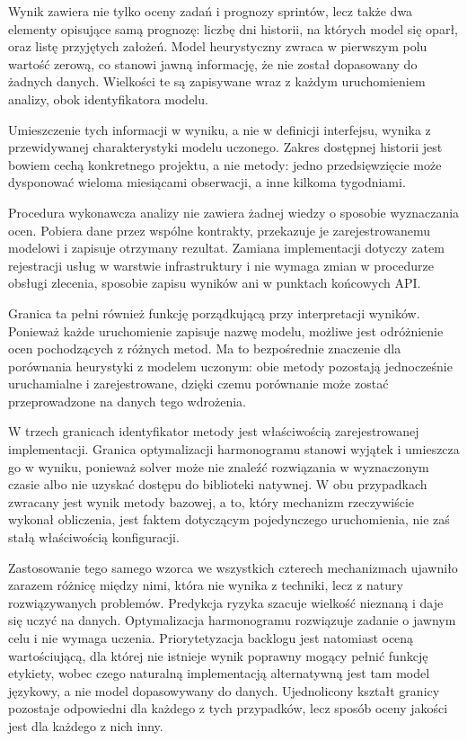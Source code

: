 Wynik zawiera nie tylko oceny zadań i prognozy sprintów, lecz także dwa elementy opisujące samą prognozę: liczbę dni historii, na których model się oparł, oraz listę przyjętych założeń. Model heurystyczny zwraca w pierwszym polu wartość zerową, co stanowi jawną informację, że nie został dopasowany do żadnych danych. Wielkości te są zapisywane wraz z każdym uruchomieniem analizy, obok identyfikatora modelu.

Umieszczenie tych informacji w wyniku, a nie w definicji interfejsu, wynika z przewidywanej charakterystyki modelu uczonego. Zakres dostępnej historii jest bowiem cechą konkretnego projektu, a nie metody: jedno przedsięwzięcie może dysponować wieloma miesiącami obserwacji, a inne kilkoma tygodniami.

Procedura wykonawcza analizy nie zawiera żadnej wiedzy o sposobie wyznaczania ocen. Pobiera dane przez wspólne kontrakty, przekazuje je zarejestrowanemu modelowi i zapisuje otrzymany rezultat. Zamiana implementacji dotyczy zatem rejestracji usług w warstwie infrastruktury i nie wymaga zmian w procedurze obsługi zlecenia, sposobie zapisu wyników ani w punktach końcowych API.

Granica ta pełni również funkcję porządkującą przy interpretacji wyników. Ponieważ każde uruchomienie zapisuje nazwę modelu, możliwe jest odróżnienie ocen pochodzących z różnych metod. Ma to bezpośrednie znaczenie dla porównania heurystyki z modelem uczonym: obie metody pozostają jednocześnie uruchamialne i zarejestrowane, dzięki czemu porównanie może zostać przeprowadzone na danych tego wdrożenia.

W trzech granicach identyfikator metody jest właściwością zarejestrowanej implementacji. Granica optymalizacji harmonogramu stanowi wyjątek i umieszcza go w wyniku, ponieważ solver może nie znaleźć rozwiązania w wyznaczonym czasie albo nie uzyskać dostępu do biblioteki natywnej. W obu przypadkach zwracany jest wynik metody bazowej, a to, który mechanizm rzeczywiście wykonał obliczenia, jest faktem dotyczącym pojedynczego uruchomienia, nie zaś stałą właściwością konfiguracji.

Zastosowanie tego samego wzorca we wszystkich czterech mechanizmach ujawniło zarazem różnicę między nimi, która nie wynika z techniki, lecz z natury rozwiązywanych problemów. Predykcja ryzyka szacuje wielkość nieznaną i daje się uczyć na danych. Optymalizacja harmonogramu rozwiązuje zadanie o jawnym celu i nie wymaga uczenia. Priorytetyzacja backlogu jest natomiast oceną wartościującą, dla której nie istnieje wynik poprawny mogący pełnić funkcję etykiety, wobec czego naturalną implementacją alternatywną jest tam model językowy, a nie model dopasowywany do danych. Ujednolicony kształt granicy pozostaje odpowiedni dla każdego z tych przypadków, lecz sposób oceny jakości jest dla każdego z nich inny.


